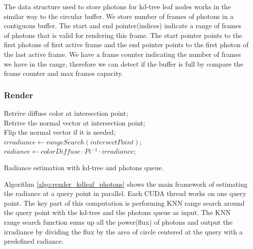 The data structure used to store photons for kd-tree leaf nodes works in the similar way to the circular buffer. We store number of frames of photons in a contiguous buffer. The start and end pointer(indices) indicate a range of frames of photons that is valid for rendering this frame. The start pointer points to the first photons of first active frame and the end pointer points to the first photon of the last active frame. We have a frame counter indicating the number of frames we have in the range, therefore we can detect if the buffer is full by compare the frame counter and max frames capacity. 


\subsubsection{Render} 

\begin{algorithm} 
	\SetAlgoLined
	
	 {
		Retrive diffuse color at intersection point; \\
		Retrive the normal vector at intersection point; \\
		Flip the normal vector if it is needed; \\ 
		\( irradiance \leftarrow rangeSearch(intersectPoint) \); \\
		\( radiance \leftarrow colorDiffuse \cdot Pi^{-1} \cdot irradiance \); 	
	}
	\caption{Radiance estimation with kd-tree and photons queue.} 	
	\label{algo:render_kdleaf_photons} 
\end{algorithm}

Algorithm \ref{algo:render_kdleaf_photons} shows the main framework of estimating the radiance at a query point in parallel. Each CUDA thread works on one query point. The key part of this computation is performing KNN range search around the query point with the kd-tree and the photons queue as input. The KNN range search function sums up all the power(flux) of photons and output the irradiance by dividing the flux by the area of circle centered at the query with a predefined radiance. 


